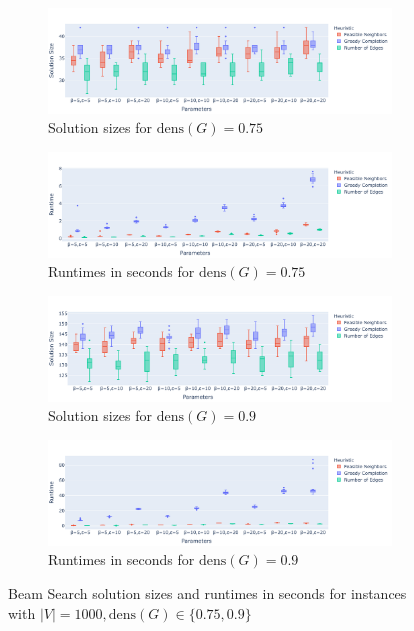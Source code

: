 \documentclass[draft,final]{vutinfth} %
\begin{document}
\begin{figure}
    \centering
    \begin{subfigure}{0.94\textwidth}
        \centering
        \includegraphics[width=\textwidth]{graphics/lbh-075-1000-size.pdf}
        \caption{Solution sizes for $\mathrm{dens}(G)=0.75$}
    \end{subfigure}
    \begin{subfigure}{0.94\textwidth}
        \centering
        \includegraphics[width=\textwidth]{graphics/lbh-075-1000-runtime.pdf}
        \caption{Runtimes in seconds for $\mathrm{dens}(G)=0.75$}
    \end{subfigure}
    \centering
    \begin{subfigure}{0.94\textwidth}
        \centering
        \includegraphics[width=\textwidth]{graphics/lbh-09-1000-size.pdf}
        \caption{Solution sizes for $\mathrm{dens}(G)=0.9$}
    \end{subfigure}
    \begin{subfigure}{0.94\textwidth}
        \centering
        \includegraphics[width=\textwidth]{graphics/lbh-09-1000-runtime.pdf}
        \caption{Runtimes in seconds for $\mathrm{dens}(G)=0.9$}
    \end{subfigure}
    \caption{Beam Search solution sizes and runtimes in seconds for instances with $|V|=1000, \mathrm{dens}(G) \in \{0.75, 0.9\}$}
    \label{fig:bs-heuristics-random-2}
\end{figure}
\end{document}
